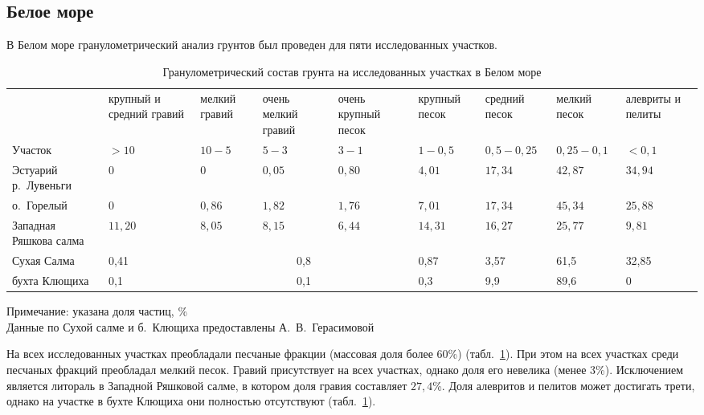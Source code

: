\subsection{Белое море}
В Белом море гранулометрический анализ грунтов был проведен для пяти исследованных участков.
    \begin{table}[p]
    \caption{Гранулометрический состав грунта на исследованных участках в Белом море}
    \label{tab:grunt_granulometriya_White}
    \begin{tabularx}{\textwidth}{|p{}|*{8}{X|}} \hline
    & круп\-ный и сред\-ний гравий  &  мел\-кий гра\-вий &  очень мел\-кий гра\-вий & очень круп\-ный песок & круп\-ный песок &  сред\-ний песок & мел\-кий песок & алеври\-ты и пели\-ты \\
        Участок &   $>10$ &  $10-5$ &   $5-3$ &  $3-1$ & $1-0,5$ &   $0,5-0,25$ &    $0,25-0,1$ &    $<0,1$
        \\ \hline
	Эстуарий р.~Лувеньги           & $0$  & $0$ & $0,05$ & $0,80$ & $4,01$  & $17,34$  & $42,87$ & $34,94$          \\ \hline
	о.~Горелый   & $0$  & $0,86$ & $1,82$ & $1,76$ & $7,01$  & $17,34$  & $45,34$ & $25,88$          \\ \hline
	Западная Ряшкова салма& $11,20$ & $8,05$ & $8,15$ & $6,44$ & $14,31$ & $16,27$  & $25,77$ & $9,81$           \\         \hline
	Сухая Салма                    & 0,41           & \multicolumn{3}{c|}{0,8}    & 0,87            & 3,57             & 61,5            & 32,85             \\ \hline
	бухта Клющиха                  & 0,1            & \multicolumn{3}{c|}{0,1}    & 0,3             & 9,9              & 89,6            & 0                 \\ \hline
    \end{tabularx}

    {\footnotesize Примечание: указана доля частиц, \% \\
Данные по Сухой салме и б.~Клющиха предоставлены А.~В.~Герасимовой}
    \end{table}
На всех исследованных участках преобладали песчаные фракции (массовая доля более $60$\%) (табл.~\ref{tab:grunt_granulometriya_White}).
При этом на всех участках среди песчаных фракций преобладал мелкий песок.
Гравий присутствует на всех участках, однако доля его невелика (менее $3$\%).
Исключением является литораль в Западной Ряшковой салме, в котором доля гравия составляет $27,4$\%.
Доля алевритов и пелитов может достигать трети, однако на участке в бухте Клющиха они полностью отсутствуют (табл.~\ref{tab:grunt_granulometriya_White}).




